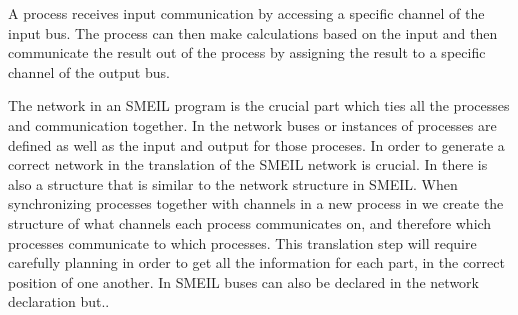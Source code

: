 A process receives input communication by accessing a specific channel of the input bus. The process can then make calculations based on the input and then communicate the result out of the process by assigning the result to a specific channel of the output bus.





The network in an SMEIL program is the crucial part which ties all the processes and communication together. In the network buses or instances of processes are defined as well as the input and output for those proceses. In order to generate a correct network in \cspm the translation of the SMEIL network is crucial.
In \cspm there is also a structure that is similar to the network structure in SMEIL. When synchronizing processes together with channels in a new process in \cspm we create the structure of what channels each process communicates on, and therefore which processes communicate to which processes.
This translation step will require carefully planning in order to get all the information for each part, in the correct position of one another. In SMEIL buses can also be declared in the network declaration but.. %



